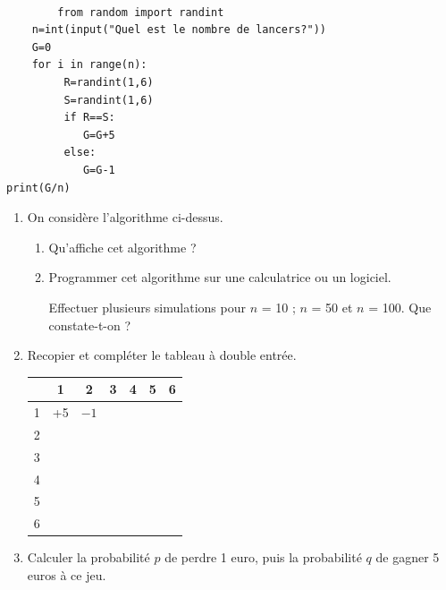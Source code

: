 \documentclass[11pt]{cornouaille}
\begin{document}
\bigskip

\begin{verbatim}

		from random import randint
    n=int(input("Quel est le nombre de lancers?"))
    G=0
    for i in range(n):
         R=randint(1,6)
         S=randint(1,6)
         if R==S:
            G=G+5
         else:
            G=G-1
print(G/n)
\end{verbatim}

\bigskip

\begin{enumerate}
 \item On consid\`{e}re l'algorithme ci-dessus.
   \begin{enumerate}
   \item Qu'affiche cet algorithme ?

   \item Programmer cet algorithme sur une calculatrice ou un
     logiciel.  

     Effectuer plusieurs simulations pour $n$ = 10 ; $n$ = 50 et $n$ =
     100. Que constate-t-on ?
   \end{enumerate}
 \item Recopier et compl\'{e}ter le tableau \`{a} double entr\'{e}e.

   \begin{center}
     \begin{tabular}{|*7{c|}}
       \hline
       \rowcolor{FondTableaux}
       {\cellcolor{white}}
       & 1  & 2    & 3 & 4 & 5 & 6 \\       \hline       
       \cellcolor{FondTableaux}1 & +5 & $-1$ &   &   &   &   \\    \hline
       \cellcolor{FondTableaux}2 &    &      &   &   &   &   \\     \hline
       \cellcolor{FondTableaux}3 &    &      &   &   &   &   \\       \hline
       \cellcolor{FondTableaux}4 &    &      &   &   &   &   \\       \hline
       \cellcolor{FondTableaux}5 &    &      &   &   &   &   \\       \hline
       \cellcolor{FondTableaux}6 &    &      &   &   &   &   \\       \hline
     \end{tabular}
   \end{center}

 \item  Calculer la probabilit\'{e} $p$ de perdre 1 euro, puis
   la probabilit\'{e} $q$ de gagner 5 euros \`{a} ce jeu.


\end{enumerate}
\end{document}
